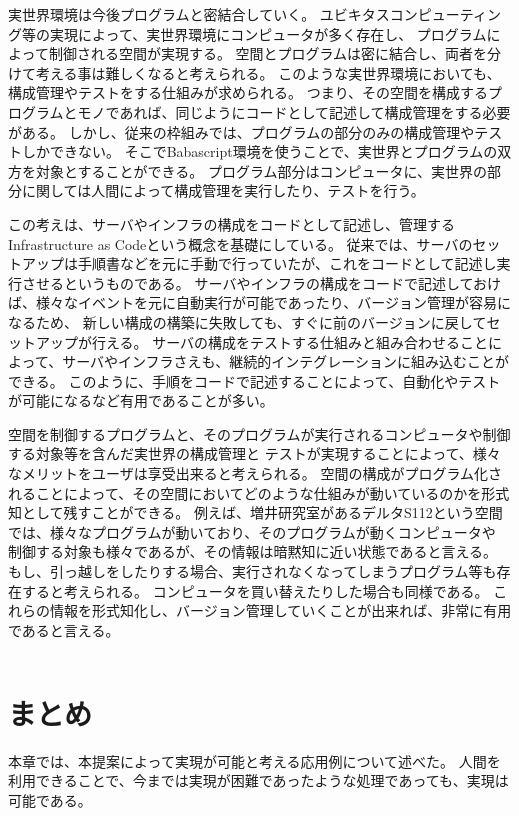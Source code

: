 実世界環境は今後プログラムと密結合していく。
ユビキタスコンピューティング等の実現によって、実世界環境にコンピュータが多く存在し、
プログラムによって制御される空間が実現する。
空間とプログラムは密に結合し、両者を分けて考える事は難しくなると考えられる。
このような実世界環境においても、構成管理やテストをする仕組みが求められる。
つまり、その空間を構成するプログラムとモノであれば、同じようにコードとして記述して構成管理をする必要がある。
しかし、従来の枠組みでは、プログラムの部分のみの構成管理やテストしかできない。
そこでBabascript環境を使うことで、実世界とプログラムの双方を対象とすることができる。
プログラム部分はコンピュータに、実世界の部分に関しては人間によって構成管理を実行したり、テストを行う。

この考えは、サーバやインフラの構成をコードとして記述し、管理するInfrastructure
as Codeという概念を基礎にしている。
従来では、サーバのセットアップは手順書などを元に手動で行っていたが、これをコードとして記述し実行させるというものである。
サーバやインフラの構成をコードで記述しておけば、様々なイベントを元に自動実行が可能であったり、バージョン管理が容易になるため、
新しい構成の構築に失敗しても、すぐに前のバージョンに戻してセットアップが行える。
サーバの構成をテストする仕組みと組み合わせることによって、サーバやインフラさえも、継続的インテグレーションに組み込むことができる。
このように、手順をコードで記述することによって、自動化やテストが可能になるなど有用であることが多い。

空間を制御するプログラムと、そのプログラムが実行されるコンピュータや制御する対象等を含んだ実世界の構成管理と
テストが実現することによって、様々なメリットをユーザは享受出来ると考えられる。
空間の構成がプログラム化されることによって、その空間においてどのような仕組みが動いているのかを形式知として残すことができる。
例えば、増井研究室があるデルタS112という空間では、様々なプログラムが動いており、そのプログラムが動くコンピュータや
制御する対象も様々であるが、その情報は暗黙知に近い状態であると言える。
もし、引っ越しをしたりする場合、実行されなくなってしまうプログラム等も存在すると考えられる。
コンピュータを買い替えたりした場合も同様である。
これらの情報を形式知化し、バージョン管理していくことが出来れば、非常に有用であると言える。

\begin{lstlisting}[caption=hogefuga, label=hoge]
\end{lstlisting}

\section{まとめ}\label{ux307eux3068ux3081}

本章では、本提案によって実現が可能と考える応用例について述べた。
人間を利用できることで、今までは実現が困難であったような処理であっても、実現は可能である。
